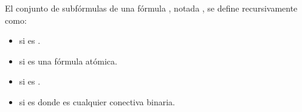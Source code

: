 \begin{isabellebody}
\begin{isamarkuptext}
  \begin{definicion}
  El conjunto de subfórmulas de una fórmula , notada , se 
  define recursivamente como:
    \begin{itemize}
      \item \isa{{\isacharbraceleft}{\isasymbottom}{\isacharbraceright}} si  es \isa{{\isasymbottom}}.
      \item {} si  es una fórmula atómica.
      \item {} si  es .
      \item {} si  es  donde \isa{{\isacharasterisk}} es 
        cualquier conectiva binaria.
    \end{itemize}
  \end{definicion}


\end{isamarkuptext}
\end{isabellebody}
